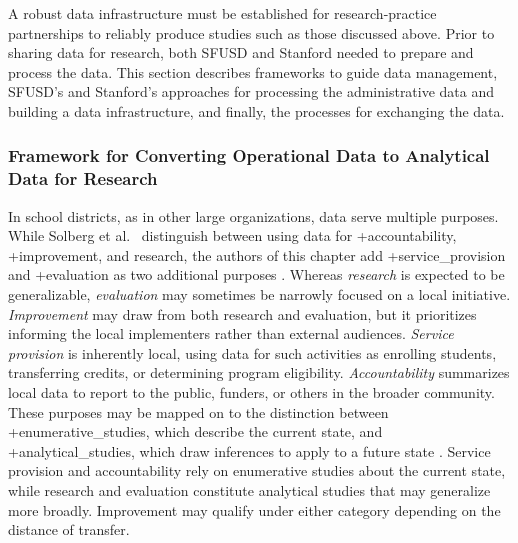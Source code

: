 \documentclass[
]{WileySix}
\begin{document}
A robust data infrastructure must be established for research-practice partnerships to reliably produce studies such as those discussed above. Prior to sharing data for research, both SFUSD and Stanford needed to prepare and process the data. This section describes frameworks to guide data management, SFUSD's and Stanford's approaches for processing the administrative data and building a data infrastructure, and finally, the processes for exchanging the data.

\hypertarget{framework-for-converting-operational-data-to-analytical-data-for-research}{%
\subsubsection{Framework for Converting Operational Data to Analytical Data for Research}\label{framework-for-converting-operational-data-to-analytical-data-for-research}}

In school districts, as in other large organizations, data serve multiple purposes. While Solberg et al.~\citeyearpar{solberg1997} distinguish between using data for +accountability\textbar, +improvement\textbar, and research, the authors of this chapter add +service\_provision\textbar{} and +evaluation\textbar{} as two additional purposes \citep{sanfranciscounifiedschooldistrict2019}. Whereas \emph{research} is expected to be generalizable, \emph{evaluation} may sometimes be narrowly focused on a local initiative. \emph{Improvement} may draw from both research and evaluation, but it prioritizes informing the local implementers rather than external audiences. \emph{Service provision} is inherently local, using data for such activities as enrolling students, transferring credits, or determining program eligibility. \emph{Accountability} summarizes local data to report to the public, funders, or others in the broader community. These purposes may be mapped on to the distinction between +enumerative\_studies\textbar, which describe the current state, and +analytical\_studies\textbar, which draw inferences to apply to a future state \citep{deming1953, provost2011}. Service provision and accountability rely on enumerative studies about the current state, while research and evaluation constitute analytical studies that may generalize more broadly. Improvement may qualify under either category depending on the distance of transfer.
\end{document}
